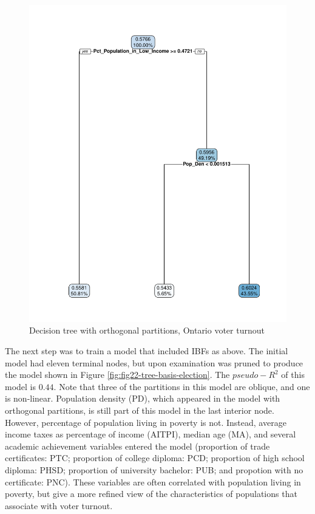 \documentclass[]{elsarticle} %
\makeatletter
\def\maxwidth{\ifdim\Gin@nat@width>\linewidth\linewidth
\else\Gin@nat@width\fi}
\let\Oldincludegraphics\includegraphics
\renewcommand{\includegraphics}[1]{\Oldincludegraphics[width=\maxwidth]{#1}}
\makeatother
\begin{document}
\begin{figure}
\centering
\includegraphics{Trees_with_Base_Functions_v2_files/figure-latex/fig21-tree-orthogonal-election-1.pdf}
\caption{\label{fig:fig21-tree-orthogonal-election}Decision tree with
orthogonal partitions, Ontario voter turnout}
\end{figure}

The next step was to train a model that included IBFs as above. The
initial model had eleven terminal nodes, but upon examination was pruned
to produce the model shown in Figure
\ref{fig:fig22-tree-basis-election}. The \(pseudo-R^2\) of this model is
\(0.44\). Note that three of the partitions in this model are oblique,
and one is non-linear. Population density (PD), which appeared in the
model with orthogonal partitions, is still part of this model in the
last interior node. However, percentage of population living in poverty
is not. Instead, average income taxes as percentage of income (AITPI),
median age (MA), and several academic achievement variables entered the
model (proportion of trade certificates: PTC; proportion of college
diploma: PCD; proportion of high school diploma: PHSD; proportion of
university bachelor: PUB; and propotion with no certificate: PNC). These
variables are often correlated with population living in poverty, but
give a more refined view of the characteristics of populations that
associate with voter turnout.
\end{document}
